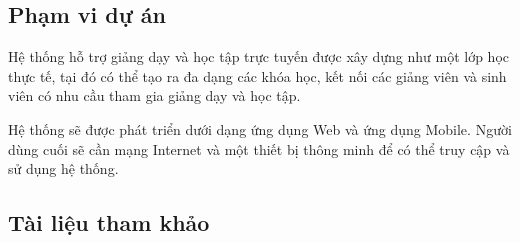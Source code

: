 \documentclass[./../main_file.tex]{subfiles}
\begin{document}
	\subsection{Phạm vi dự án}
	Hệ thống hỗ trợ giảng dạy và học tập trực tuyến được xây dựng như một lớp học thực tế, tại đó có thể tạo ra đa dạng các khóa học, kết nối các giảng viên và sinh viên có nhu cầu tham gia giảng dạy và học tập.
	
	
	Hệ thống sẽ được phát triển dưới dạng ứng dụng Web và ứng dụng Mobile. Người dùng cuối sẽ cần mạng Internet và một thiết bị thông minh để có thể truy cập và sử dụng hệ thống.
	
	\subsection{Tài liệu tham khảo}
	\nocite{*}
	\printbibliography[heading=none]
	
\end{document}
